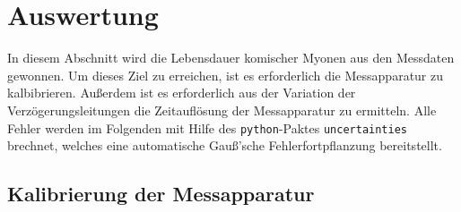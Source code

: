 \section{Auswertung}
In diesem Abschnitt wird die Lebensdauer komischer Myonen aus den Messdaten gewonnen.
Um dieses Ziel zu erreichen, ist es erforderlich die Messapparatur zu kalbibrieren. Außerdem
ist es erforderlich aus der Variation der Verzögerungsleitungen die 
Zeitauflösung der Messapparatur zu ermitteln. Alle Fehler werden im Folgenden mit Hilfe
des \texttt{python}-Paktes \texttt{uncertainties} brechnet, welches eine automatische
Gauß'sche Fehlerfortpflanzung bereitstellt.

\subsection{Kalibrierung der Messapparatur}